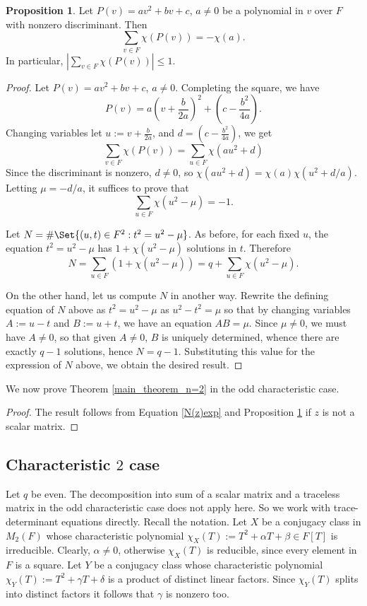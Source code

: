 \documentclass[preprint,11pt]{amsart}
\theoremstyle{definition}
\numberwithin{thm}{section}
\newtheorem{prop}[thm]{Proposition}
\newcommand{\abs}[1]{\left| #1 \right|}
\newcommand{\al}{\alpha}
\begin{document}
\begin{prop}\label{P(v)_expression}
Let $P(v) = av^2 + b v + c$, $a \neq 0$ be a polynomial in $v$ over $F$ with nonzero discriminant. Then 
$$
\sum_{v \in F} \chi(P(v)) = - \chi(a).
$$
In particular, $\abs{\sum_{v \in F} \chi(P(v))} \leq 1$.
\end{prop}
\begin{proof}
Let $P(v) = av^2 + b v + c$, $a \neq 0$. Completing the square, we have 
$$
P(v) = a \left( v + \frac{b}{2a} \right)^2 + \left( c - \frac{b^2}{4a} \right).
$$
Changing variables let $u := v + \frac{b}{2a}$, and $d = \left( c- \frac{b^2}{4a} \right)$, we get
$$
\sum_{v \in F} \chi(P(v)) = \sum_{u \in F} \chi(au^2 +d)
$$
Since the discriminant is nonzero, $d \neq 0$, so $\chi(au^2 +d) = \chi(a) \chi(u^2 + d/a)$. Letting $\mu = - d/a$,  it suffices to prove that 
$$
\sum_{u \in F} \chi(u^2 - \mu) = -1.
$$

Let $N = \# \Set{(u,t) \in F^2 : t^2 = u^2 - \mu}$. As before, for each fixed $u$, the equation $t^2 = u^2 - \mu$ has $1 + \chi(u^2 - \mu)$ solutions in $t$. Therefore 
$$
N = \sum_{u \in F} (1 + \chi(u^2 - \mu)) = q + \sum_{u \in F} \chi(u^2 - \mu).
$$


On the other hand, let us compute $N$ in another way. Rewrite the defining equation of $N$ above as $t^2 = u^2 - \mu$ as $u^2 - t^2 = \mu$ so that by changing variables $A := u-t$ and $B := u+t$, we have an equation $AB = \mu$. Since $\mu \neq 0$, we must have $A \neq 0$, so that given $A \neq 0$,  $B$ is uniquely determined, whence there are exactly $q-1$ solutions, hence $N = q-1$. Substituting this value for the expression of $N$ above, we obtain the desired result.
\end{proof}


We now prove Theorem \ref{main_theorem_n=2} in the odd characteristic case.

\begin{proof}
The result follows from  Equation \eqref{N(z)exp} and Proposition \ref{P(v)_expression} if $z$ is not a scalar matrix.
\end{proof}

\subsection{Characteristic $2$ case}

Let $q$ be even. The decomposition into sum of a scalar matrix and a traceless matrix  in the odd characteristic case does not apply here. So we work with trace-determinant equations directly. Recall the notation. Let $X$ be a conjugacy class in $M_2(F)$ whose characteristic polynomial $\chi_X(T) := T^2 + \al T + \beta \in F[T]$ is irreducible. Clearly, $\alpha \neq 0$, otherwise $\chi_X(T)$ is reducible, since every element in $F$ is a square. Let $Y$ be a conjugacy class whose characteristic polynomial $\chi_Y(T) := T^2+ \gamma T + \delta$ is a product of distinct linear factors. Since $\chi_Y(T)$ splits into distinct factors it follows that $\gamma$ is nonzero too.
\end{document}
